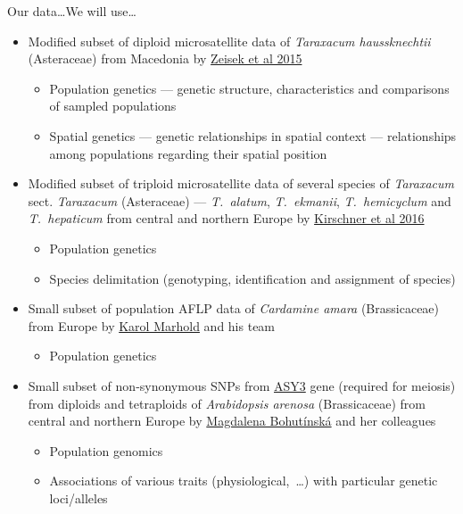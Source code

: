 \documentclass[compress, xelatex, 11pt, xcolor=svgnames, aspectratio=169, url={hyphens, lowtilde}]{beamer}
\begin{document}
\begin{frame}[allowframebreaks]{Our data\ldots}{We will use\ldots}
		\begin{itemize}
			\item Modified subset of diploid microsatellite data of \textit{Taraxacum haussknechtii} (Asteraceae) from Macedonia by \href{https://trapa.cz/en/taraxacum-section-dioszegia}{Zeisek et al 2015}
			\begin{itemize}
				\item Population genetics --- genetic structure, characteristics and comparisons of sampled populations
				\item Spatial genetics --- genetic relationships in spatial context --- relationships among populations regarding their spatial position
			\end{itemize}
			\item Modified subset of triploid microsatellite data of several species of \textit{Taraxacum} sect. \textit{Taraxacum} (Asteraceae) --- \textit{T.~alatum}, \textit{T.~ekmanii}, \textit{T.~hemicyclum} and \textit{T.~hepaticum} from central and northern Europe by \href{https://trapa.cz/en/identif-oligoclonal-agamospermous-microsp}{Kirschner et al 2016}
			\begin{itemize}
				\item Population genetics
				\item Species delimitation (genotyping, identification and assignment of species)
			\end{itemize}
			\item Small subset of population AFLP data of \textit{Cardamine amara} (Brassicaceae) from Europe by \href{https://web.natur.cuni.cz/botanika/brassiploidy/marholdcv/}{Karol Marhold} and his team
			\begin{itemize}
				\item Population genetics
			\end{itemize}
			\item Small subset of non-synonymous SNPs from \href{https://www.arabidopsis.org/servlets/TairObject?type=locus&name=At2g46980}{ASY3} gene (required for meiosis) from diploids and tetraploids of \textit{Arabidopsis arenosa} (Brassicaceae) from central and northern Europe by \href{https://scholar.google.com/citations?user=kSnTudAAAAAJ}{Magdalena Bohutínská} and her colleagues
			\begin{itemize}
				\item Population genomics
				\item Associations of various traits (physiological,~\ldots) with particular genetic loci/alleles

\end{itemize}
\end{itemize}
\end{frame}
\end{document}
